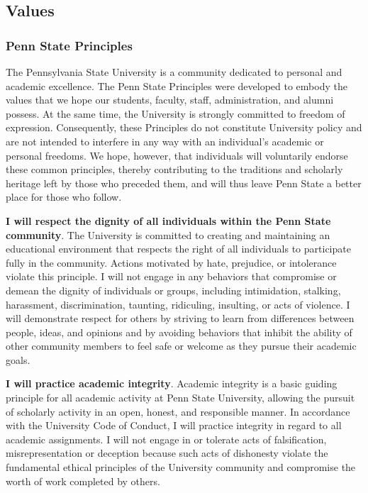 \documentclass[
  letterpaper,
  DIV=11,
  numbers=noendperiod]{scrartcl}
\begin{document}
\subsection{Values}\label{values}

\subsubsection*{Penn State Principles}\label{psu-principles}

The Pennsylvania State University is a community dedicated to personal
and academic excellence. The Penn State Principles were developed to
embody the values that we hope our students, faculty, staff,
administration, and alumni possess. At the same time, the University is
strongly committed to freedom of expression. Consequently, these
Principles do not constitute University policy and are not intended to
interfere in any way with an individual's academic or personal freedoms.
We hope, however, that individuals will voluntarily endorse these common
principles, thereby contributing to the traditions and scholarly
heritage left by those who preceded them, and will thus leave Penn State
a better place for those who follow.

\textbf{I will respect the dignity of all individuals within the Penn
State community}. The University is committed to creating and
maintaining an educational environment that respects the right of all
individuals to participate fully in the community. Actions motivated by
hate, prejudice, or intolerance violate this principle. I will not
engage in any behaviors that compromise or demean the dignity of
individuals or groups, including intimidation, stalking, harassment,
discrimination, taunting, ridiculing, insulting, or acts of violence. I
will demonstrate respect for others by striving to learn from
differences between people, ideas, and opinions and by avoiding
behaviors that inhibit the ability of other community members to feel
safe or welcome as they pursue their academic goals.

\textbf{I will practice academic integrity}. Academic integrity is a
basic guiding principle for all academic activity at Penn State
University, allowing the pursuit of scholarly activity in an open,
honest, and responsible manner. In accordance with the University Code
of Conduct, I will practice integrity in regard to all academic
assignments. I will not engage in or tolerate acts of falsification,
misrepresentation or deception because such acts of dishonesty violate
the fundamental ethical principles of the University community and
compromise the worth of work completed by others.
\end{document}
